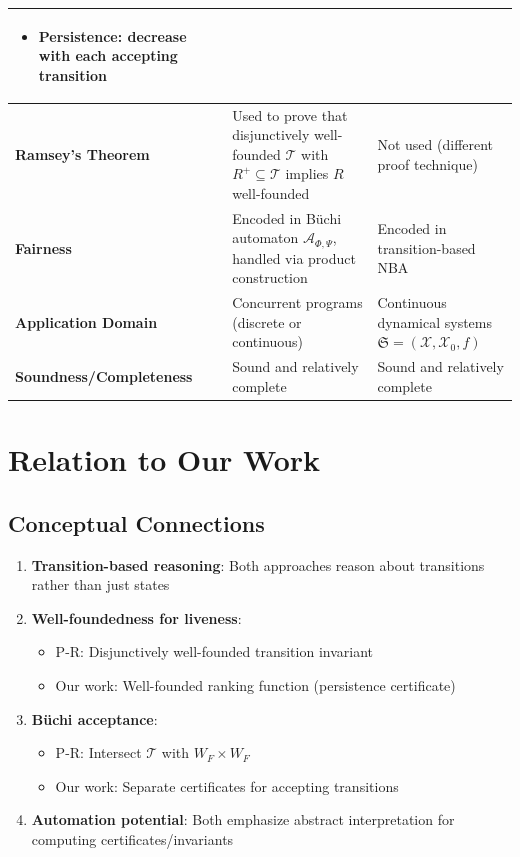\documentclass{article}
\begin{document}
\begin{center}
\begin{tabular}{|p{3.5cm}|p{5.5cm}|p{5.5cm}|}
\begin{itemize}
\item Persistence: decrease with each accepting transition
\end{itemize} \\
\hline
\textbf{Ramsey's Theorem} & Used to prove that disjunctively well-founded $\mathcal{T}$ with $R^+ \subseteq \mathcal{T}$ implies $R$ well-founded & Not used (different proof technique) \\
\hline
\textbf{Fairness} & Encoded in Büchi automaton $\mathcal{A}_{\Phi,\Psi}$, handled via product construction & Encoded in transition-based NBA \\
\hline
\textbf{Application Domain} & Concurrent programs (discrete or continuous) & Continuous dynamical systems $\mathfrak{S} = (\mathcal{X}, \mathcal{X}_0, f)$ \\
\hline
\textbf{Soundness/Completeness} & Sound and relatively complete & Sound and relatively complete \\
\hline
\end{tabular}
\end{center}

\section{Relation to Our Work}

\subsection{Conceptual Connections}

\begin{enumerate}
    \item \textbf{Transition-based reasoning}: Both approaches reason about transitions rather than just states

    \item \textbf{Well-foundedness for liveness}:
    \begin{itemize}
        \item P-R: Disjunctively well-founded transition invariant
        \item Our work: Well-founded ranking function (persistence certificate)
    \end{itemize}

    \item \textbf{Büchi acceptance}:
    \begin{itemize}
        \item P-R: Intersect $\mathcal{T}$ with $W_F \times W_F$
        \item Our work: Separate certificates for accepting transitions
    \end{itemize}

    \item \textbf{Automation potential}: Both emphasize abstract interpretation for computing certificates/invariants
\end{enumerate}
\end{document}
